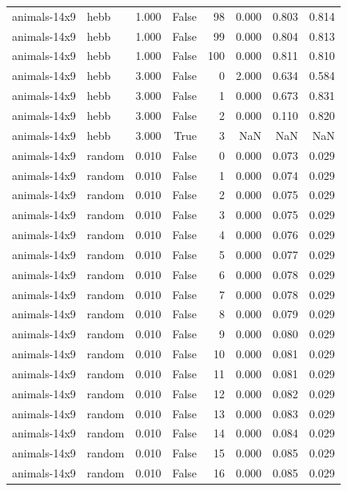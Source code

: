 \begin{tabular}{llrrrrrr}
animals-14x9 & hebb & 1.000 & False & 98 & 0.000 & 0.803 & 0.814 \\
animals-14x9 & hebb & 1.000 & False & 99 & 0.000 & 0.804 & 0.813 \\
animals-14x9 & hebb & 1.000 & False & 100 & 0.000 & 0.811 & 0.810 \\
animals-14x9 & hebb & 3.000 & False & 0 & 2.000 & 0.634 & 0.584 \\
animals-14x9 & hebb & 3.000 & False & 1 & 0.000 & 0.673 & 0.831 \\
animals-14x9 & hebb & 3.000 & False & 2 & 0.000 & 0.110 & 0.820 \\
animals-14x9 & hebb & 3.000 & True & 3 & NaN & NaN & NaN \\
animals-14x9 & random & 0.010 & False & 0 & 0.000 & 0.073 & 0.029 \\
animals-14x9 & random & 0.010 & False & 1 & 0.000 & 0.074 & 0.029 \\
animals-14x9 & random & 0.010 & False & 2 & 0.000 & 0.075 & 0.029 \\
animals-14x9 & random & 0.010 & False & 3 & 0.000 & 0.075 & 0.029 \\
animals-14x9 & random & 0.010 & False & 4 & 0.000 & 0.076 & 0.029 \\
animals-14x9 & random & 0.010 & False & 5 & 0.000 & 0.077 & 0.029 \\
animals-14x9 & random & 0.010 & False & 6 & 0.000 & 0.078 & 0.029 \\
animals-14x9 & random & 0.010 & False & 7 & 0.000 & 0.078 & 0.029 \\
animals-14x9 & random & 0.010 & False & 8 & 0.000 & 0.079 & 0.029 \\
animals-14x9 & random & 0.010 & False & 9 & 0.000 & 0.080 & 0.029 \\
animals-14x9 & random & 0.010 & False & 10 & 0.000 & 0.081 & 0.029 \\
animals-14x9 & random & 0.010 & False & 11 & 0.000 & 0.081 & 0.029 \\
animals-14x9 & random & 0.010 & False & 12 & 0.000 & 0.082 & 0.029 \\
animals-14x9 & random & 0.010 & False & 13 & 0.000 & 0.083 & 0.029 \\
animals-14x9 & random & 0.010 & False & 14 & 0.000 & 0.084 & 0.029 \\
animals-14x9 & random & 0.010 & False & 15 & 0.000 & 0.085 & 0.029 \\
animals-14x9 & random & 0.010 & False & 16 & 0.000 & 0.085 & 0.029 \\

\end{tabular}

